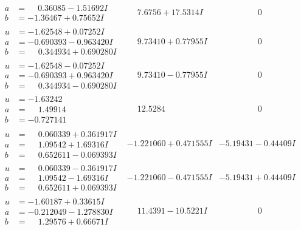 \documentclass[1p]{elsarticle_modified}
\theoremstyle{definition}
\begin{document}
$$\begin{array}{c|c|c}
\begin{aligned}
a &= \phantom{-}0.36085 - 1.51692 I \\
b &= -1.36467 + 0.75652 I\end{aligned}
 & \phantom{-}7.6756 + 17.5314 I & \phantom{-0.000000 } 0 \\ \hline\begin{aligned}
u &= -1.62548 + 0.07252 I \\
a &= -0.690393 - 0.963420 I \\
b &= \phantom{-}0.344934 + 0.690280 I\end{aligned}
 & \phantom{-}9.73410 + 0.77955 I & \phantom{-0.000000 } 0 \\ \hline\begin{aligned}
u &= -1.62548 - 0.07252 I \\
a &= -0.690393 + 0.963420 I \\
b &= \phantom{-}0.344934 - 0.690280 I\end{aligned}
 & \phantom{-}9.73410 - 0.77955 I & \phantom{-0.000000 } 0 \\ \hline\begin{aligned}
u &= -1.63242\phantom{ +0.000000I} \\
a &= \phantom{-}1.49914\phantom{ +0.000000I} \\
b &= -0.727141\phantom{ +0.000000I}\end{aligned}
 & \phantom{-}12.5284\phantom{ +0.000000I} & \phantom{-0.000000 } 0 \\ \hline\begin{aligned}
u &= \phantom{-}0.060339 + 0.361917 I \\
a &= \phantom{-}1.09542 + 1.69316 I \\
b &= \phantom{-}0.652611 - 0.069393 I\end{aligned}
 & -1.221060 + 0.471555 I & -5.19431 - 0.44409 I \\ \hline\begin{aligned}
u &= \phantom{-}0.060339 - 0.361917 I \\
a &= \phantom{-}1.09542 - 1.69316 I \\
b &= \phantom{-}0.652611 + 0.069393 I\end{aligned}
 & -1.221060 - 0.471555 I & -5.19431 + 0.44409 I \\ \hline\begin{aligned}
u &= -1.60187 + 0.33615 I \\
a &= -0.212049 - 1.278830 I \\
b &= \phantom{-}1.29576 + 0.66671 I\end{aligned}
 & \phantom{-}11.4391 - 10.5221 I & \phantom{-0.000000 } 0 \\ \hline\begin{aligned}

\end{aligned}
\end{array}$$
\end{document}
